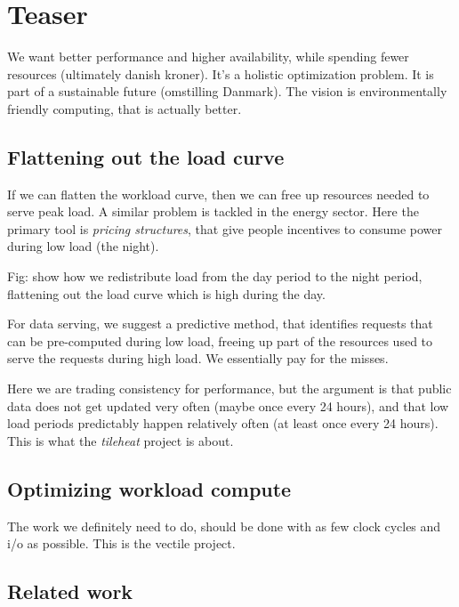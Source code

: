 \section{Teaser}
We want better performance and higher availability, while spending fewer resources (ultimately danish kroner). It's a holistic optimization problem. It is part of a sustainable future (omstilling Danmark). The vision is environmentally friendly computing, that is actually better.

\subsection{Flattening out the load curve}
If we can flatten the workload curve, then we can free up resources needed to serve peak load. A similar problem is tackled in the energy sector. Here the primary tool is \emph{pricing structures}, that give people incentives to consume power during low load (the night).

Fig: show how we redistribute load from the day period to the night period, flattening out the load curve which is high during the day.

For data serving, we suggest a predictive method, that identifies requests that can be pre-computed during low load, freeing up part of the resources used to serve the requests during high load. We essentially pay for the misses.

Here we are trading consistency for performance, but the argument is that public data does not get updated very often (maybe once every 24 hours), and that low load periods predictably happen relatively often (at least once every 24 hours). This is what the \emph{tileheat} project is about.

\subsection{Optimizing workload compute}
The work we definitely need to do, should be done with as few clock cycles and i/o as possible. This is the vectile project.

\subsection{Related work}

